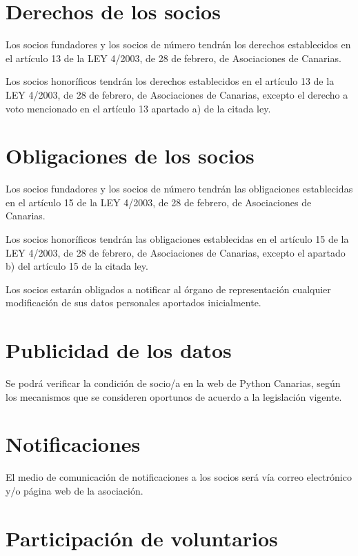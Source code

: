 \documentclass[a4paper, 12pt, oneside]{book}
\begin{document}
\section{Derechos de los socios}

Los socios fundadores y los socios de número tendrán los derechos establecidos en el artículo 13 de la LEY 4/2003, de 28 de febrero, de Asociaciones de Canarias.

Los socios honoríficos tendrán los derechos establecidos en el artículo 13 de la LEY 4/2003, de 28 de febrero, de Asociaciones de Canarias, excepto el derecho a voto mencionado en el artículo 13 apartado a) de la citada ley.

\section{Obligaciones de los socios}

Los socios fundadores y los socios de número tendrán las obligaciones establecidas en el artículo 15 de la LEY 4/2003, de 28 de febrero, de Asociaciones de Canarias.

Los socios honoríficos tendrán las obligaciones establecidas en el artículo 15 de la LEY 4/2003, de 28 de febrero, de Asociaciones de Canarias, excepto el apartado b) del artículo 15 de la citada ley.

Los socios estarán obligados a notificar al órgano de representación cualquier modificación de sus datos personales aportados inicialmente.

\section{Publicidad de los datos}

Se podrá verificar la condición de socio/a en la web de Python Canarias, según los mecanismos que se consideren oportunos de acuerdo a la legislación vigente.

\section{Notificaciones}

El medio de comunicación de notificaciones a los socios será vía correo electrónico y/o página web de la asociación.

\section{Participación de voluntarios}
\end{document}
